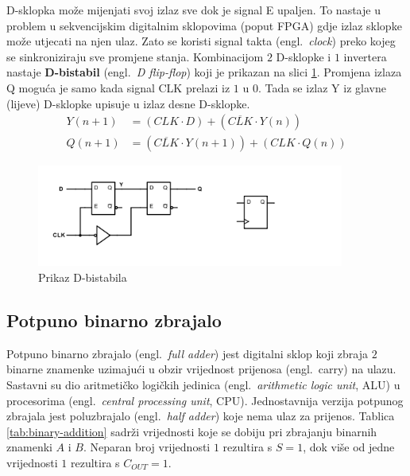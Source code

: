 \documentclass[times, utf8, diplomski]{fer}
\begin{document}
D-sklopka može mijenjati svoj izlaz sve dok je signal E upaljen. To nastaje u problem u sekvencijskim digitalnim sklopovima (poput FPGA) gdje izlaz sklopke može utjecati na njen ulaz. Zato se koristi signal takta (engl.~\textit{clock}) preko kojeg se sinkroniziraju sve promjene stanja. Kombinacijom $2$ D-sklopke i $1$ invertera nastaje \textbf{D-bistabil} (engl.~\textit{D flip-flop}) koji je prikazan na slici \ref{fig:D-flip-flop}. Promjena izlaza Q moguća je samo kada signal CLK prelazi iz $1$ u $0$. Tada se izlaz Y iz glavne (lijeve) D-sklopke upisuje u izlaz desne D-sklopke.
%
\begin{align}
	Y(n+1) &= (CLK \cdot D) + (\overline{CLK} \cdot Y(n)) \\
	Q(n+1) &= (\overline{CLK} \cdot Y(n+1)) + (CLK \cdot Q(n))
\end{align}

\begin{figure}[htb]
	\centering
	\includegraphics[width=0.9\textwidth]{img/D_flip-flop_full.png}
	\caption{Prikaz D-bistabila}
	\label{fig:D-flip-flop}
\end{figure}

\subsection{Potpuno binarno zbrajalo}

Potpuno binarno zbrajalo (engl.~\textit{full adder}) jest digitalni sklop koji zbraja $2$ binarne znamenke uzimajući u obzir vrijednost prijenosa (engl.~carry) na ulazu. Sastavni su dio aritmetičko logičkih jedinica (engl.~\textit{arithmetic logic unit}, ALU) u procesorima (engl.~\textit{central processing unit}, CPU). Jednostavnija verzija potpunog zbrajala jest poluzbrajalo (engl.~\textit{half adder}) koje nema ulaz za prijenos. Tablica \ref{tab:binary-addition} sadrži vrijednosti koje se dobiju pri zbrajanju binarnih znamenki $A$ i $B$. Neparan broj vrijednosti $1$ rezultira s $S=1$, dok više od jedne vrijednosti $1$ rezultira s $C_{OUT}=1$.
\end{document}
